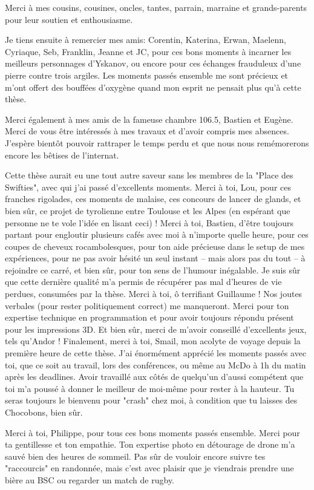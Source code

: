 Merci à mes cousins, cousines, oncles, tantes, parrain, marraine et grands-parents pour leur soutien et enthousiasme.

Je tiens ensuite à remercier mes amis: Corentin, Katerina, Erwan, Maelenn, Cyriaque, Seb, Franklin, Jeanne et JC, pour ces bons moments à incarner les meilleurs personnages d'Yskanov, ou encore pour ces échanges frauduleux d'une pierre contre trois argiles.
Les moments passés ensemble me sont précieux et m'ont offert des bouffées d'oxygène quand mon esprit ne pensait plus qu'à cette thèse.

Merci également à mes amis de la fameuse chambre 106.5, Bastien et Eugène.
Merci de vous être intéressés à mes travaux et d'avoir compris mes absences.
J'espère bientôt pouvoir rattraper le temps perdu et que nous nous remémorerons encore les bêtises de l'internat.

Cette thèse aurait eu une tout autre saveur sans les membres de la "Place des Swifties", avec qui j’ai passé d’excellents moments.
Merci à toi, Lou, pour ces franches rigolades, ces moments de malaise, ces concours de lancer de glands, et bien sûr, ce projet de tyrolienne entre Toulouse et les Alpes (en espérant que personne ne te vole l’idée en lisant ceci) !
Merci à toi, Bastien, d’être toujours partant pour engloutir plusieurs cafés avec moi à n’importe quelle heure, pour ces coupes de cheveux rocambolesques, pour ton aide précieuse dans le setup de mes expériences, pour ne pas avoir hésité un seul instant – mais alors pas du tout – à rejoindre ce carré, et bien sûr, pour ton sens de l’humour inégalable.
Je suis sûr que cette dernière qualité m’a permis de récupérer pas mal d’heures de vie perdues, consumées par la thèse.
Merci à toi, ô terrifiant Guillaume ! Nos joutes verbales (pour rester politiquement correct) me manqueront.
Merci pour ton expertise technique en programmation et pour avoir toujours répondu présent pour les impressions 3D.
Et bien sûr, merci de m’avoir conseillé d’excellents jeux, tels qu'Andor !
Finalement, merci à toi, Smail, mon acolyte de voyage depuis la première heure de cette thèse.
J'ai énormément apprécié les moments passés avec toi, que ce soit au travail, lors des conférences, ou même au McDo à 1h du matin après les deadlines.
Avoir travaillé aux côtés de quelqu'un d’aussi compétent que toi m’a poussé à donner le meilleur de moi-même pour rester à la hauteur.
Tu seras toujours le bienvenu pour "crash" chez moi, à condition que tu laisses des Chocobons, bien sûr.

Merci à toi, Philippe, pour tous ces bons moments passés ensemble.
Merci pour ta gentillesse et ton empathie.
Ton expertise photo en détourage de drone m'a sauvé bien des heures de sommeil.
Pas sûr de vouloir encore suivre tes "raccourcis" en randonnée, mais c’est avec plaisir que je viendrais prendre une bière au BSC ou regarder un match de rugby.

